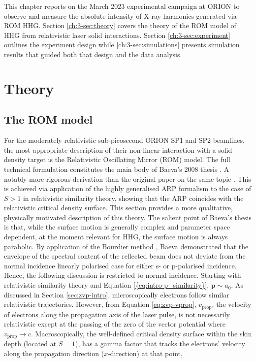 This chapter reports on the March 2023 experimental campaign at ORION to observe and measure the absolute intensity of X-ray harmonics generated via ROM HHG. Section \ref{ch:3-sec:theory} covers the theory of the ROM model of HHG from relativistic laser solid interactions. Section \ref{ch:3-sec:experiment} outlines the experiment design while \ref{ch:3-sec:simulations} presents simulation results that guided both that design and the data analysis. 

\section{\label{ch:3-sec:theory}Theory}
\subsection{The ROM model}
For the moderately relativistic sub-picosecond ORION SP1 and SP2 beamlines, the most appropriate description of their non-linear interaction with a solid density target is the Relativistic Oscillating Mirror (ROM) model. The full technical formulation constitutes the main body of Baeva's 2008 thesis \cite{baevaHighHarmonicGeneration2008}. A notably more rigorous derivation than the original paper on the same topic \cite{baevaTheoryHighorderHarmonic2006}. This is achieved via application of the highly generalised \ac{ARP} formalism to the case of $S>1$ in relativistic similarity theory, showing that the \ac{ARP} coincides with the relativistic critical density surface. This section provides a more qualitative, physically motivated description of this theory. The salient point of Baeva's thesis is that, while the surface motion is generally complex and parameter space dependent, at the moment relevant for HHG, the surface motion is always parabolic. By application of the Bourdier method \cite{bourdierObliqueIncidenceStrong1983}, Baeva demonstrated that the envelope of the spectral content of the reflected beam does not deviate from the normal incidence linearly polarised case for either s- or p-polarised incidence. Hence, the following discussion is restricted to normal incidence. Starting with relativistic similarity theory and Equation \ref{{eq:intro-p_similarity}}, $\mathbf{p} \sim a_0$. As discussed in Section \ref{sec:zvp-intro}, microscopically electrons follow similar relativistic trajectories. However, from Equation \ref{eq:zvp-vprop}, $v_\mathrm{prop}$, the velocity of electrons along the propagation axis of the laser pulse, is not necessarily relativistic except at the passing of the zero of the vector potential where $v_\mathrm{prop} \to c$. Macroscopically, the well-defined critical density surface within the skin depth (located at $S =1$), has a gamma factor that tracks the electrons' velocity along the propagation direction ($x$-direction) at that point,

